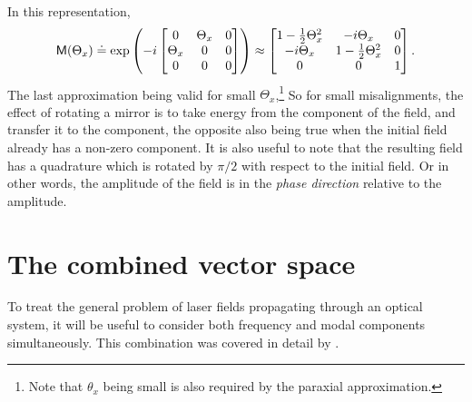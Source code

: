 In this representation, 
\begin{equation}
\label{eqn:mirrortilt}
\mathsf{M}(\Theta_x) \doteq \exp \left( -i 
\left[\begin{matrix} 
0 & \Theta_x & 0 \\
\Theta_x & 0 & 0 \\
0 & 0 & 0 
\end{matrix}\right]
\right)
\approx
\left[\begin{matrix}
1-\frac{1}{2}\Theta_x^2 & -i\Theta_x& 0 \\
-i\Theta_x & 1-\frac{1}{2}\Theta_x^2& 0 \\
0 & 0 & 1 \\
\end{matrix}\right] .
\end{equation}
The last approximation being valid for small $\Theta_x$,\footnote{Note that $\theta_x$ being small is also required by the paraxial approximation.}
So for small misalignments, the effect of rotating a mirror is to take energy from the  component of the field, and transfer it to the  component, the opposite also being true when the initial field already has a non-zero  component. %
It is also useful to note that the resulting  field has a quadrature which is rotated by $\pi/2$ with respect to the initial  field. %
Or in other words, the amplitude of the  field is in the \emph{phase direction} relative to the  amplitude.

\section{The combined vector space}
To treat the general problem of laser fields propagating through an optical system, it will be useful to consider both frequency and modal components simultaneously. %
This combination was covered in detail by \citet{Sigg:00}.

